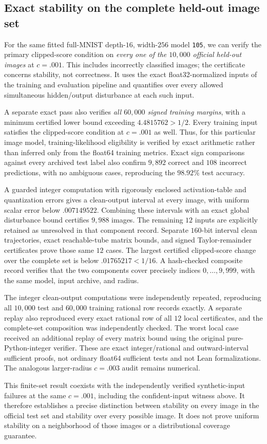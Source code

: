 \subsection{Exact stability on the complete held-out image set}
For the same fitted full-MNIST depth-$16$, width-$256$ model \texttt{105}, we can verify the primary clipped-score condition on \emph{every one of the $10{,}000$ official held-out images} at $c=.001$.  This includes incorrectly classified images; the certificate concerns stability, not correctness.  It uses the exact float32-normalized inputs of the training and evaluation pipeline and quantifies over every allowed simultaneous hidden/output disturbance at each such input.

A separate exact pass also verifies \emph{all $60{,}000$ signed training margins}, with a minimum certified lower bound exceeding $4.4815762>1/2$.  Every training input satisfies the clipped-score condition at $c=.001$ as well.  Thus, for this particular image model, training-likelihood eligibility is verified by exact arithmetic rather than inferred only from the float64 training metrics.  Exact sign comparisons against every archived test label also confirm $9{,}892$ correct and $108$ incorrect predictions, with no ambiguous cases, reproducing the $98.92\%$ test accuracy.

A guarded integer computation with rigorously enclosed activation-table and quantization errors gives a clean-output interval at every image, with uniform scalar error below $.007149522$.  Combining these intervals with an exact global disturbance bound certifies $9{,}988$ images.  The remaining $12$ inputs are explicitly retained as unresolved in that component record.  Separate $160$-bit interval clean trajectories, exact reachable-tube matrix bounds, and signed Taylor-remainder certificates prove those same $12$ cases.  The largest certified clipped-score change over the complete set is below $.01765217<1/16$.  A hash-checked composite record verifies that the two components cover precisely indices $0,\ldots,9{,}999$, with the same model, input archive, and radius.

The integer clean-output computations were independently repeated, reproducing all $10{,}000$ test and $60{,}000$ training rational row records exactly.  A separate replay also reproduced every exact rational row of all $12$ local certificates, and the complete-set composition was independently checked.  The worst local case received an additional replay of every matrix bound using the original pure-Python-integer verifier.  These are exact integer/rational and outward-interval sufficient proofs, not ordinary float64 sufficient tests and not Lean formalizations.  The analogous larger-radius $c=.003$ audit remains numerical.

This finite-set result coexists with the independently verified synthetic-input failures at the same $c=.001$, including the confident-input witness above.  It therefore establishes a precise distinction between stability on every image in the official test set and stability over every possible image.  It does not prove uniform stability on a neighborhood of those images or a distributional coverage guarantee.

